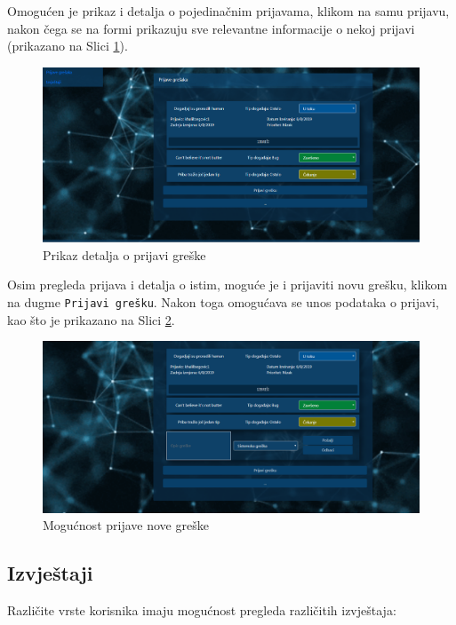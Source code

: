 \documentclass[12pt,a4paper]{article}
\begin{document}
Omogućen je prikaz i detalja o pojedinačnim prijavama, klikom na samu prijavu, nakon čega se na formi prikazuju sve relevantne informacije o nekoj prijavi (prikazano na Slici \ref{s13}).

\begin{figure}[H]
\center
\includegraphics[scale=0.35]{../res/UI/errorDetails.PNG}
\caption{Prikaz detalja o prijavi greške}
\label{s13}
\end{figure}

Osim pregleda prijava i detalja o istim, moguće je i prijaviti novu grešku, klikom na dugme \texttt{Prijavi grešku}. Nakon toga omogućava se unos podataka o prijavi, kao što je prikazano na Slici \ref{s14}.

\begin{figure}[H]
\center
\includegraphics[scale=0.35]{../res/UI/errorAdd.PNG}
\caption{Mogućnost prijave nove greške}
\label{s14}
\end{figure}

\newpage

\subsection{Izvještaji}

Različite vrste korisnika imaju mogućnost pregleda različitih izvještaja:
\end{document}

